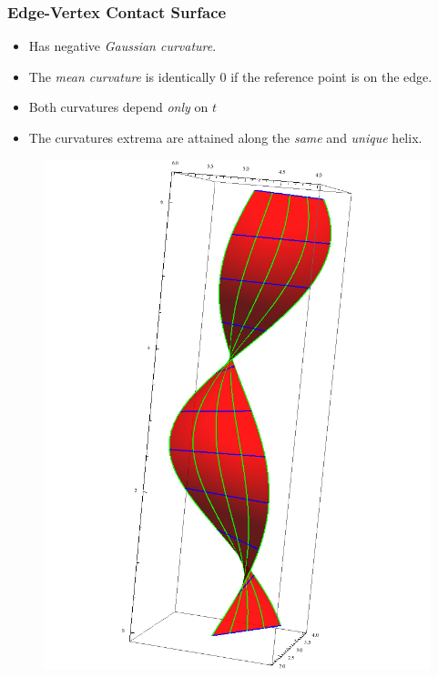 \documentclass[ucs,9pt,pagenumbersfull]{beamer}
\begin{document}
\begin{frame}
  \frametitle{Edge-Vertex Contact Surface}
  \begin{minipage}{0.63\linewidth}
    \begin{itemize}
    \item Has negative \emph{Gaussian curvature}.
    \item The \emph{mean curvature} is identically \(0\) if the reference point
      is on the edge.
    \item Both curvatures depend \emph{only} on \(t\)
    \item The curvatures extrema are attained along the \emph{same}
      and \emph{unique} helix.
    \end{itemize}

  \end{minipage}
  \hfill
  \begin{minipage}{0.35\linewidth}
    \begin{figure}
      \centering
      \includegraphics[height=0.95\textheight]{Figures/ev-full-contact}
    \end{figure}
  \end{minipage}
\end{frame}
\end{document}
